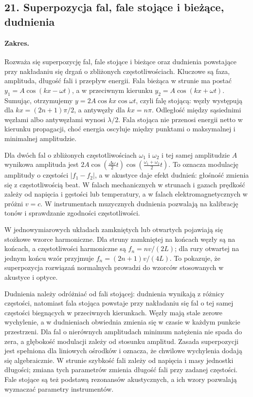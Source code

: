 \documentclass[11pt,a4paper]{article}
\begin{document}
\subsection{21. Superpozycja fal, fale stojące i bieżące, dudnienia}
\paragraph{Zakres.} Rozważa się superpozycję fal, fale stojące i bieżące oraz dudnienia powstające przy nakładaniu się drgań o zbliżonych częstotliwościach. Kluczowe są faza, amplituda, długość fali i przepływ energii. Fala bieżąca w strunie ma postać $y_1=A\cos(kx-\omega t)$, a w przeciwnym kierunku $y_2=A\cos(kx+\omega t)$. Sumując, otrzymujemy $y=2A\cos kx\cos\omega t$, czyli falę stojącą: węzły występują dla $kx=(2n+1)\pi/2$, a antywęzły dla $kx=n\pi$. Odległość między sąsiednimi węzłami albo antywęzłami wynosi $\lambda/2$. Fala stojąca nie przenosi energii netto w kierunku propagacji, choć energia oscyluje między punktami o maksymalnej i minimalnej amplitudzie.\par
Dla dwóch fal o zbliżonych częstotliwościach $\omega_1$ i $\omega_2$ i tej samej amplitudzie $A$ wynikowa amplituda jest $2A\cos\left(\frac{\Delta\omega}{2}t\right)\cos\left(\frac{\omega_1+\omega_2}{2}t\right)$. To oznacza modulację amplitudy o częstości $|f_1-f_2|$, a w akustyce daje efekt dudnień: głośność zmienia się z częstotliwością beat. W falach mechanicznych w strunach i gazach prędkość zależy od napięcia i gęstości lub temperatury, a w falach elektromagnetycznych w próżni $v=c$. W instrumentach muzycznych dudnienia pozwalają na kalibrację tonów i sprawdzanie zgodności częstotliwości.\par
W jednowymiarowych układach zamkniętych lub otwartych pojawiają się stożkowe wzorce harmoniczne. Dla struny zamkniętej na końcach węzły są na końcach, a częstotliwości harmoniczne są $f_n = n v/(2L)$; dla rury otwartej na jednym końcu wzór przyjmuje $f_n=(2n+1)v/(4L)$. To pokazuje, że superpozycja rozwiązań normalnych prowadzi do wzorców stosowanych w akustyce i optyce.\par

Dudnienia należy odróżniać od fali stojącej: dudnienia wynikają z różnicy częstości, natomiast fala stojąca powstaje przy nakładaniu się fal o tej samej częstości biegnących w przeciwnych kierunkach. Węzły mają stale zerowe wychylenie, a w dudnieniach obwiednia zmienia się w czasie w każdym punkcie przestrzeni. Dla fal o nierównych amplitudach minimum natężenia nie spada do zera, a głębokość modulacji zależy od stosunku amplitud. Zasada superpozycji jest spełniona dla liniowych ośrodków i oznacza, że chwilowe wychylenia dodają się algebraicznie. W strunie szybkość fali zależy od napięcia i masy jednostki długości; zmiana tych parametrów zmienia długość fali przy zadanej częstości. Fale stojące są też podstawą rezonansów akustycznych, a ich wzory pozwalają wyznaczać parametry instrumentów.
\par
\end{document}
